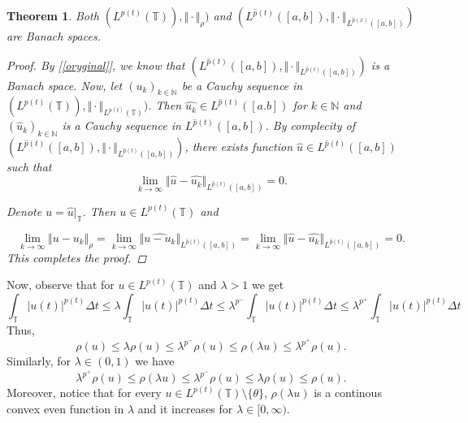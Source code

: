 \documentclass[12pt,a4paper,oneside,titlepage]{article}
\newtheorem{Twierdzenie}{Theorem}
\begin{document}
\begin{Twierdzenie} 
Both $(L^{p(t)}(\mathbb{T})), \Vert \cdot \Vert_{\rho})$  and $ (L^{\widehat{p}(t)}([a,b]), \Vert \cdot \Vert_{L^{\widehat{p}(x)}([a,b])})$ are Banach spaces.
\begin{proof}
By [\ref{oryginal}], we know that $(L^{\widehat{p}(t)}([a,b]), \Vert \cdot \Vert_{L^{\widehat{p}(t)}([a,b])})$ is a Banach space. Now, let $(u_k)_{k \in \mathbb{N}}$ be a Cauchy sequence in $(L^{p(t)}(\mathbb{T})), \Vert \cdot \Vert_{L^{p(t)}(\mathbb{T})})$. Then $\widehat{u_k} \in L^{\widehat{p}(t)}([a.b]) $ for $k \in \mathbb{N}$ and $(\widehat{u}_{k})_{k \in \mathbb{N}}$ is a Cauchy sequence in $L^{\widehat{p}(t)}([a,b]) $. By complecity of $(L^{\widehat{p}(t)}([a,b]), \Vert \cdot \Vert_{L^{\widehat{p}(t)}([a,b])})$, there exists function $\widehat{u} \in L^{\widehat{p}(t)}([a,b])$ such that
\begin{equation}
\nonumber
\lim_{k \rightarrow \infty}\Vert \widehat{u} - \widehat{u_k} \Vert_{L^{\widehat{p}(t)}([a,b])}=0.
\end{equation}
\begin{flushleft}
Denote $u = \widehat{u} |_{\mathbb{T}}$. Then $u \in L^{p(t)}(\mathbb{T})$ and 
\end{flushleft}
\begin{equation}
\nonumber
\lim_{k \rightarrow \infty} \Vert u - u_k \Vert_{\rho} = \lim_{k \rightarrow \infty} \Vert \widehat{u - u_k} \Vert_{L^{\widehat{p}(t)}([a,b])} = \lim_{k \rightarrow \infty} \Vert \widehat{u} - \widehat{u_k} \Vert_{L^{\widehat{p}(t)}([a,b])}=0.
\end{equation}
This completes the proof.
\end{proof}
\end{Twierdzenie} 
\smallskip
Now, observe that for $u \in L^{p(t)}(\mathbb{T})$ and $\lambda>1$ we get
\begin{equation}
\nonumber
 \int_{\mathbb{T}} \vert u(t) \vert^{{p}(t)} \Delta t \leq
\lambda   \int_{\mathbb{T}} \vert u(t) \vert^{p(t)} \Delta t \leq \lambda^{p^-} \int_{\mathbb{T}} \vert u(t) \vert^{p(t)} \Delta t \leq  
\lambda^{p^+} \int_{\mathbb{T}} \vert u(t) \vert^{p(t)} \Delta t
\end{equation}
Thus,
\begin{equation}
\label{3_ciagi_1}
\rho(u) \leq \lambda \rho(u) \leq \lambda^{p^{-}} \rho(u) \leq \rho(\lambda u) \leq \lambda^{p^{+}} \rho(u).
\end{equation}
Similarly, for $\lambda \in (0,1)$ we have
\begin{equation}
\label{3_ciagi_2}
\lambda^{p^{+}} \rho(u) \leq \rho(\lambda u) \leq \lambda^{p^{-}} \rho(u) \leq \lambda \rho(u) \leq \rho(u).
\end{equation}
\indent
Moreover, notice that for every $u \in L^{p(t)}(\mathbb{T})\setminus \lbrace \theta \rbrace $, $\rho(\lambda u)$ is a continous convex even function in $\lambda$ and it increases for $\lambda \in [0, \infty)$.
\end{document}
